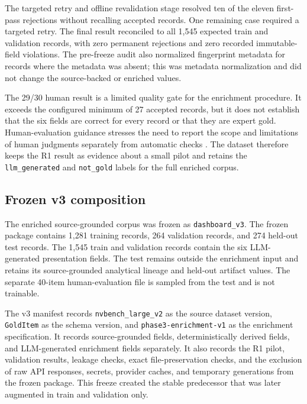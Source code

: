 The targeted retry and offline revalidation stage resolved ten of the eleven first-pass rejections without recalling accepted records. One remaining case required a targeted retry. The final result reconciled to all 1,545 expected train and validation records, with zero permanent rejections and zero recorded immutable-field violations. The pre-freeze audit also normalized fingerprint metadata for records where the metadata was absent; this was metadata normalization and did not change the source-backed or enriched values.

The 29/30 human result is a limited quality gate for the enrichment procedure. It exceeds the configured minimum of 27 accepted records, but it does not establish that the six fields are correct for every record or that they are expert gold. Human-evaluation guidance stresses the need to report the scope and limitations of human judgments separately from automatic checks \cite{vanderlee2019human}. The dataset therefore keeps the R1 result as evidence about a small pilot and retains the \texttt{llm\_generated} and \texttt{not\_gold} labels for the full enriched corpus.

\subsection{Frozen v3 composition}

The enriched source-grounded corpus was frozen as \texttt{dashboard\_v3}. The frozen package contains 1,281 training records, 264 validation records, and 274 held-out test records. The 1,545 train and validation records contain the six LLM-generated presentation fields. The test remains outside the enrichment input and retains its source-grounded analytical lineage and held-out artifact values. The separate 40-item human-evaluation file is sampled from the test and is not trainable.

The v3 manifest records \texttt{nvbench\_large\_v2} as the source dataset version, \texttt{GoldItem} as the schema version, and \texttt{phase3-enrichment-v1} as the enrichment specification. It records source-grounded fields, deterministically derived fields, and LLM-generated enrichment fields separately. It also records the R1 pilot, validation results, leakage checks, exact file-preservation checks, and the exclusion of raw API responses, secrets, provider caches, and temporary generations from the frozen package. This freeze created the stable predecessor that was later augmented in train and validation only.


